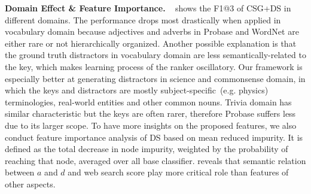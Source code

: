 


\noindent
\textbf{Domain Effect \& Feature Importance.} ~ shows the F1@3 of CSG+DS in different domains. The performance drops most drastically when applied in vocabulary domain because adjectives and adverbs in Probase and WordNet are either rare or not hierarchically organized. Another possible explanation is that the ground truth distractors in vocabulary domain are less semantically-related to the key, which makes learning process of the ranker oscillatory.
Our framework is especially better at generating distractors in science and commonsense domain, in which the keys and distractors are mostly subject-specific~(e.g. physics) terminologies, real-world entities and other common nouns. Trivia domain has similar characteristic but the keys are often rarer, therefore Probase suffers less due to its larger scope.
To have more insights on the proposed features, we also conduct feature importance analysis of DS based on mean reduced impurity. It is defined as the total decrease in node impurity, weighted by the probability of reaching that node, averaged over all base classifier.  reveals that semantic relation between $a$ and $d$ and web search score play more critical role than features of other aspects.
\label{sec:endtoend}

